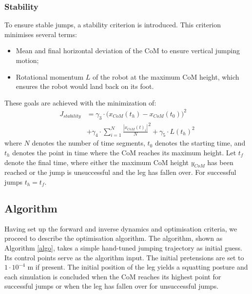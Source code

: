 \documentclass[letterpaper, 10 pt, conference]{ieeeconf}  %
\begin{document}
\subsubsection{Stability}
To ensure stable jumps, a stability criterion is introduced. This criterion minimises several terms:
\begin{itemize}
	\item Mean and final horizontal deviation of the CoM to ensure vertical jumping motion;
	\item Rotational momentum $L$ of the robot at the maximum CoM height, which ensures the robot would land back on its foot.
\end{itemize}
These goals are achieved with the minimization of:
\begin{equation}
	\begin{aligned}
		J_{stability} & =  \gamma_3\cdot \Big( x_{CoM}(t_h)-x_{CoM}(t_0) \Big)^2  \\ & +\gamma_4\cdot  {\sum^{N}_{i=1}\frac{| x_{CoM}(t)_i |}{N}}^2   
+ \gamma_5  \cdot   L(t_h)^2 
	\end{aligned}
\end{equation}
where $N$ denotes the number of time segments, $t_0$ denotes the starting time, and $t_h$ denotes the point in time where the CoM reaches its maximum height. Let $t_f$ denote the final time, where either the maximum CoM height $y_{CoM}$ has been reached or the jump is unsuccessful and the leg has fallen over. For successful jumps $t_h=t_f$.

\subsection{Algorithm}
\label{subsec:algorithm}
Having set up the forward and inverse dynamics and optimisation criteria, we proceed to describe the optimisation algorithm. The algorithm, shown as Algorithm \ref{algo}, takes a simple hand-tuned jumping trajectory as initial guess. Its control points serve as the algorithm input. The initial pretensions are set to $1 \cdot 10^{-4}$ m if present. 
The initial position of the leg yields a squatting posture and each simulation is concluded when the CoM reaches its highest point for successful jumps or when the leg has fallen over for unsuccessful jumps. 
\end{document}
